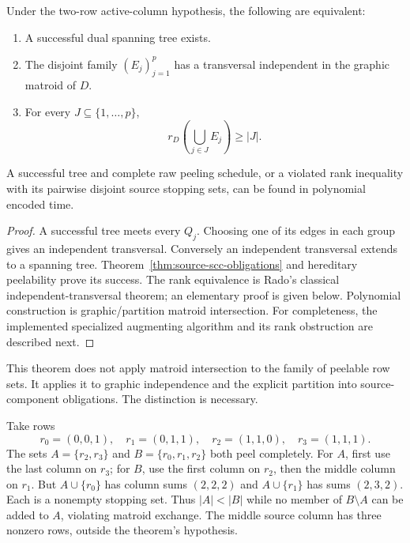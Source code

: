 \begin{theorem}
\label{thm:polynomial-dual-forest}
Under the two-row active-column hypothesis, the following are equivalent:
\begin{enumerate}
\item A successful dual spanning tree exists.
\item The disjoint family $(E_j)_{j=1}^p$ has a transversal independent
in the graphic matroid of $D$.
\item For every $J\subseteq\{1,\ldots,p\}$,
\[
                  r_D\left(\bigcup_{j\in J}E_j\right)\ge |J|.
\]
\end{enumerate}
A successful tree and complete raw peeling schedule, or a violated rank
inequality with its pairwise disjoint source stopping sets, can be found
in polynomial encoded time.
\end{theorem}
\begin{proof}
A successful tree meets every $Q_j$.  Choosing one of its edges in each
group gives an independent transversal.  Conversely an independent
transversal extends to a spanning tree.  Theorem~\ref{thm:source-scc-obligations}
and hereditary peelability prove its success.  The rank equivalence is
Rado's classical independent-transversal theorem; an elementary proof is
given below.  Polynomial construction is graphic/partition matroid
intersection.  For completeness, the implemented specialized augmenting
algorithm and its rank obstruction are described next.
\end{proof}

This theorem does not apply matroid intersection to the family of
peelable row sets.  It applies it to graphic independence and the explicit
partition into source-component obligations.  The distinction is necessary.

\begin{example}
Take rows
\[
 r_0=(0,0,1),\quad r_1=(0,1,1),\quad
 r_2=(1,1,0),\quad r_3=(1,1,1).
\]
The sets $A=\{r_2,r_3\}$ and $B=\{r_0,r_1,r_2\}$ both peel completely.
For $A$, first use the last column on $r_3$; for $B$, use the first column
on $r_2$, then the middle column on $r_1$.  But $A\cup\{r_0\}$ has
column sums $(2,2,2)$ and $A\cup\{r_1\}$ has sums $(2,3,2)$.  Each is
a nonempty stopping set.  Thus $|A|<|B|$ while no member of $B\setminus A$
can be added to $A$, violating matroid exchange.  The middle source
column has three nonzero rows, outside the theorem's hypothesis.
\end{example}

